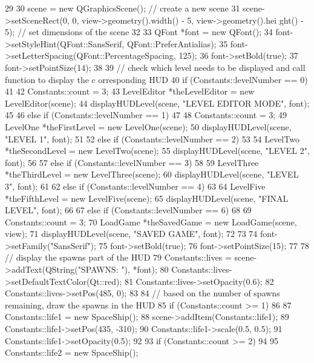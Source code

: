 \begin{DoxyCode}
29 {
30     scene = new QGraphicsScene();                   // create a new scene
31     scene->setSceneRect(0, 0, view->geometry().width() - 5,  view->geometry().hei
      ght() - 5);       // set dimensions of the scene
32 
33     QFont *font = new QFont();
34     font->setStyleHint(QFont::SansSerif, QFont::PreferAntialias);
35     font->setLetterSpacing(QFont::PercentageSpacing, 125);
36     font->setBold(true);
37     font->setPointSize(14);
38 
39     // check which level needs to be displayed and call function to display the c
      orresponding HUD
40     if (Constants::levelNumber == 0)
41     {
42         Constants::count = 3;
43         LevelEditor *theLevelEditor = new LevelEditor(scene);
44         displayHUDLevel(scene, "LEVEL EDITOR MODE", font);
45     }
46     else if (Constants::levelNumber == 1)
47     {
48         Constants::count = 3;
49         LevelOne *theFirstLevel = new LevelOne(scene);
50         displayHUDLevel(scene, "LEVEL 1", font);
51     }
52     else if (Constants::levelNumber == 2)
53     {
54         LevelTwo *theSecondLevel = new LevelTwo(scene);
55         displayHUDLevel(scene, "LEVEL 2", font);
56     }
57     else if (Constants::levelNumber == 3)
58     {
59         LevelThree *theThirdLevel = new LevelThree(scene);
60         displayHUDLevel(scene, "LEVEL 3", font);
61     }
62     else if (Constants::levelNumber == 4)
63     {
64         LevelFive *theFifthLevel = new LevelFive(scene);
65         displayHUDLevel(scene, "FINAL LEVEL", font);
66     }
67     else if (Constants::levelNumber == 6)
68     {
69         Constants::count = 3;
70         LoadGame *theSavedGame = new LoadGame(scene, view);
71         displayHUDLevel(scene, "SAVED GAME", font);
72     }
73 
74     font->setFamily("SansSerif");
75     font->setBold(true);
76     font->setPointSize(15);    
77 
78     // display the spawns part of the HUD
79     Constants::lives = scene->addText(QString("SPAWNS: "), *font);
80     Constants::lives->setDefaultTextColor(Qt::red);
81     Constants::lives->setOpacity(0.6);
82     Constants::lives->setPos(485, 0);
83 
84     // based on the number of spawns remaining, draw the spawns in the HUD
85     if (Constants::count >= 1)
86     {
87         Constants::life1 = new SpaceShip();
88         scene->addItem(Constants::life1);
89         Constants::life1->setPos(435, -310);
90         Constants::life1->scale(0.5, 0.5);
91         Constants::life1->setOpacity(0.5);
92     }
93     if (Constants::count >= 2)
94     {
95         Constants::life2 = new SpaceShip();
}}
\end{DoxyCode}
